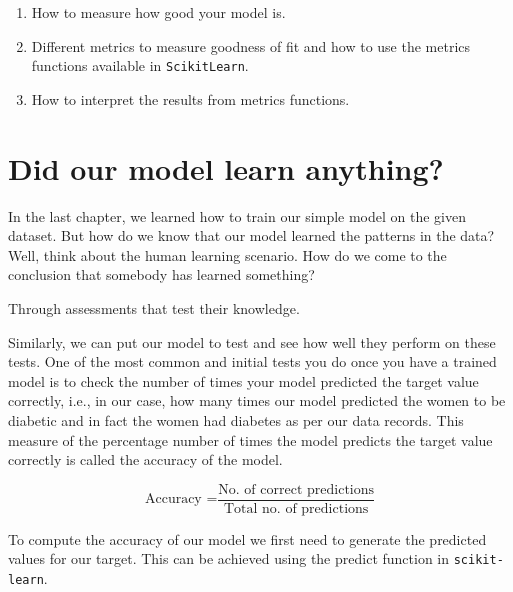 \documentclass[
  letterpaper,
]{book}
\providecommand{\tightlist}{%
  \setlength{\itemsep}{0pt}\setlength{\parskip}{0pt}}\usepackage{longtable,booktabs,array}
\begin{document}
\begin{tcolorbox}[standard jigsaw,bottomtitle=1mm, titlerule=0mm, title={In this chapter you'll learn:}, leftrule=.75mm, toptitle=1mm, arc=.35mm, rightrule=.15mm, opacitybacktitle=0.6, colframe=quarto-callout-caution-color-frame, bottomrule=.15mm, colbacktitle=quarto-callout-caution-color!10!white, colback=white, toprule=.15mm, left=2mm, coltitle=black, opacityback=0]

\begin{enumerate}
\def\labelenumi{\arabic{enumi}.}
\tightlist
\item
  How to measure how good your model is.
\item
  Different metrics to measure goodness of fit and how to use the
  metrics functions available in \texttt{ScikitLearn}.
\item
  How to interpret the results from metrics functions.
\end{enumerate}

\end{tcolorbox}

\hypertarget{did-our-model-learn-anything}{%
\section{Did our model learn
anything?}\label{did-our-model-learn-anything}}

In the last chapter, we learned how to train our simple model on the
given dataset. But how do we know that our model learned the patterns in
the data? Well, think about the human learning scenario. How do we come
to the conclusion that somebody has learned something?

Through assessments that test their knowledge.

Similarly, we can put our model to test and see how well they perform on
these tests. One of the most common and initial tests you do once you
have a trained model is to check the number of times your model
predicted the target value correctly, i.e., in our case, how many times
our model predicted the women to be diabetic and in fact the women had
diabetes as per our data records. This measure of the percentage number
of times the model predicts the target value correctly is called the
accuracy of the model.

\[\text{Accuracy =} \frac{\text{No. of correct predictions}}{\text{Total no. of predictions}}\]

To compute the accuracy of our model we first need to generate the
predicted values for our target. This can be achieved using the predict
function in \texttt{scikit-learn}.
\end{document}
